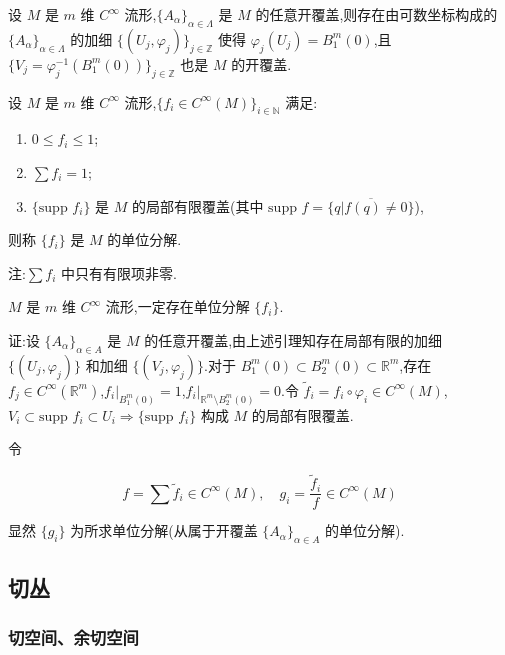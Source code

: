 \begin{lemma}
设 $M$ 是 $m$ 维 $C^\infty$ 流形,$\{A_\alpha\}_{\alpha \in \Lambda}$ 是 $M$ 的任意开覆盖,则存在由可数坐标构成的 $\{A_\alpha\}_{\alpha \in \Lambda}$ 的加细 $\{(U_j, \varphi_j)\}_{j \in \mathbb{Z}}$ 使得 $\varphi_j(U_j) = B^m_1(0)$,且 $\{V_j = \varphi_j^{-1}(B^m_1(0))\}_{j \in \mathbb{Z}}$ 也是 $M$ 的开覆盖.
\end{lemma}

\begin{definition}
设 $M$ 是 $m$ 维 $C^\infty$ 流形,$\{f_i \in C^\infty(M)\}_{i \in \mathbb{N}}$ 满足:
\begin{enumerate}
    \item $0 \leq f_i \leq 1$;
    \item $\sum f_i = 1$;
    \item $\{\text{supp } f_i\}$ 是 $M$ 的局部有限覆盖(其中 $\text{supp } f = \overline{\{q|f(q) \neq 0\}}$),
\end{enumerate}
则称 $\{f_i\}$ 是 $M$ 的单位分解.
\end{definition}

注:$\sum f_i$ 中只有有限项非零.

\begin{theorem}
$M$ 是 $m$ 维 $C^\infty$ 流形,一定存在单位分解 $\{f_i\}$.
\end{theorem}

证:设 $\{A_\alpha\}_{\alpha \in A}$ 是 $M$ 的任意开覆盖,由上述引理知存在局部有限的加细 $\{(U_j, \varphi_j)\}$ 和加细 $\{(V_j, \varphi_j)\}$.对于 $B_{1}^{m}(0) \subset B_{2}^{m}(0) \subset \mathbb{R}^m$,存在 $f_j \in C^\infty(\mathbb{R}^m)$,$f_i|_{B_{1}^{m}(0)} = 1$,$f_i|_{\mathbb{R}^m \setminus B_{2}^{m}(0)} = 0$.令 $\tilde{f}_i = f_i \circ \varphi_i \in C^\infty(M)$,$V_i \subset \text{supp } f_i \subset U_i \Rightarrow \{\text{supp } f_i\}$ 构成 $M$ 的局部有限覆盖.

令

\[
f = \sum \tilde{f}_i \in C^\infty(M), \quad g_i = \frac{\tilde{f}_i}{f} \in C^\infty(M)
\]

显然 $\{g_i\}$ 为所求单位分解(从属于开覆盖 $\{A_\alpha\}_{\alpha \in A}$ 的单位分解).

\subsection{切丛}

\subsubsection{切空间、余切空间}

